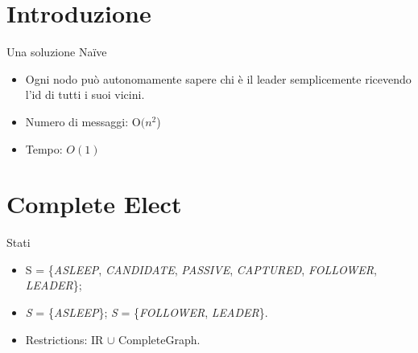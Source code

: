 

\section{Introduzione}
\begin{frame}{Una soluzione Na{\"i}ve}


\begin{itemize}
\setlength\itemsep{2em}

 \item Ogni nodo può autonomamente sapere chi è il leader semplicemente ricevendo l'id di tutti i suoi vicini.
 \item Numero di messaggi: O$(n^2$)
 \item Tempo: $O(1)$
\end{itemize}


\end{frame}

\section{Complete Elect}
\begin{frame}{Stati}


\begin{itemize}
\setlength\itemsep{2em}

 \item S = \{\textit{ASLEEP}, \textit{CANDIDATE}, \textit{PASSIVE}, \textit{CAPTURED}, \textit{FOLLOWER}, \textit{LEADER}\};
 \item \textit{S} = \{\textit{ASLEEP}\}; \textit{S} = \{\textit{FOLLOWER}, \textit{LEADER}\}.
 \item Restrictions: IR $\cup$ CompleteGraph.
\end{itemize}
\end{frame}


